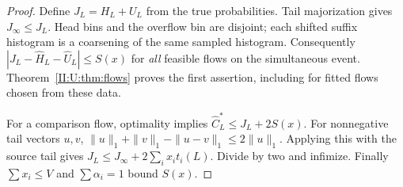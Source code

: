 \begin{proof}
Define $J_L=H_L+U_L$ from the true probabilities. Tail majorization
gives $J_\infty\le J_L$. Head bins and the overflow bin are disjoint;
each shifted suffix histogram is a coarsening of the same sampled
histogram. Consequently
$|J_L-\widehat H_L-\widehat U_L|\le S(x)$ for \emph{all} feasible
flows on the simultaneous event. Theorem~\ref{II:U:thm:flows} proves the
first assertion, including for fitted flows chosen from these data.

For a comparison flow, optimality implies
$\widehat C_L^*\le J_L+2S(x)$. For nonnegative tail vectors $u,v$,
$\|u\|_1+\|v\|_1-\|u-v\|_1\le2\|u\|_1$.
Applying this with the source tail gives
$J_L\le J_\infty+2\sum_i x_it_i(L)$. Divide by two and infimize.
Finally $\sum x_i\le V$ and $\sum\alpha_i=1$ bound $S(x)$.
\end{proof}
